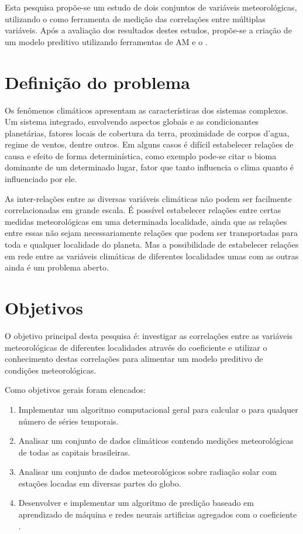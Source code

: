 Esta pesquisa propõe-se um estudo de dois conjuntos de variáveis meteorológicas, utilizando o \dmc como ferramenta de medição das correlações entre múltiplas variáveis. Após a avaliação dos resultados destes estudos, propõe-se a criação de um modelo preditivo utilizando ferramentas de AM e o \dmc.

\section{Definição do problema}
\label{sec:problema}

Os fenômenos climáticos apresentam as características dos sistemas complexos. Um sistema integrado, envolvendo aspectos globais e as condicionantes planetárias, fatores locais de cobertura da terra, proximidade de corpos d'agua, regime de ventos, dentre outros. Em alguns casos é difícil estabelecer relações de causa e efeito de forma determinística, como exemplo pode-se citar o bioma dominante de um determinado lugar, fator que tanto influencia o clima quanto é influenciado por ele.

As inter-relações entre as diversas variáveis climáticas não podem ser facilmente correlacionadas em grande escala. É possível estabelecer relações entre certas medidas meteorológicas em uma determinada localidade, ainda que as relações entre essas não sejam necessariamente relações que podem ser transportadas para toda e qualquer localidade do planeta. Mas a possibilidade de estabelecer relações em rede entre as variáveis climáticas de diferentes localidades umas com as outras ainda é um problema aberto.

\section{Objetivos}
\label{sec:Objetivos}

O objetivo principal desta pesquisa é: investigar as correlações entre as variáveis meteorológicas de diferentes localidades através do coeficiente \dmc e utilizar o conhecimento destas correlações para alimentar um modelo preditivo de condições meteorológicas.

Como objetivos gerais foram elencados:

\begin{enumerate}
    \label{enum:obj_espec}
    \item Implementar um algoritmo computacional geral para calcular o \dmc para qualquer número de séries temporais.
    \item Analisar um conjunto de dados climáticos contendo medições meteorológicas de todas as capitais brasileiras.
    \item Analisar um conjunto de dados meteorológicos sobre radiação solar com estações locadas em diversas partes do globo.
    \item Desenvolver e implementar um algoritmo de predição baseado em aprendizado de máquina e redes neurais artificias agregados com o coeficiente \dmc.
\end{enumerate}

